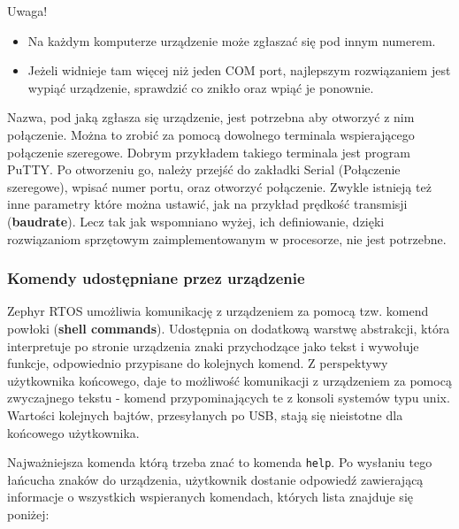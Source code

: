 \begin{minipage}{\textwidth}
\noindent Uwaga!
\vspace{-\topsep}
\begin{itemize}
    \item Na każdym komputerze urządzenie może zgłaszać się pod innym numerem.
    \item Jeżeli widnieje tam więcej niż jeden COM port, najlepszym rozwiązaniem jest wypiąć urządzenie, sprawdzić co znikło oraz wpiąć je ponownie.
\end{itemize}
\end{minipage}

\vspace{\topsep}

Nazwa, pod jaką zgłasza się urządzenie, jest potrzebna aby otworzyć z nim połączenie. Można to zrobić za pomocą dowolnego terminala wspierającego połączenie szeregowe. Dobrym przykładem takiego terminala jest program PuTTY. Po otworzeniu go, należy przejść do zakładki Serial (Połączenie szeregowe), wpisać numer portu, oraz otworzyć połączenie. Zwykle istnieją też inne parametry które można ustawić, jak na przykład prędkość transmisji (\textbf{baudrate}). Lecz tak jak wspomniano wyżej, ich definiowanie, dzięki rozwiązaniom sprzętowym zaimplementowanym w procesorze, nie jest potrzebne.

\subsubsection{Komendy udostępniane przez urządzenie}
\label{cha:commands}
Zephyr RTOS umożliwia komunikację z urządzeniem za pomocą tzw. komend powłoki (\textbf{shell commands}). Udostępnia on dodatkową warstwę abstrakcji, która interpretuje po stronie urządzenia znaki przychodzące jako tekst i wywołuje funkcje, odpowiednio przypisane do kolejnych komend. Z perspektywy użytkownika końcowego, daje to możliwość komunikacji z urządzeniem za pomocą zwyczajnego tekstu - komend przypominających te z konsoli systemów typu unix. Wartości kolejnych bajtów, przesyłanych po USB, stają się nieistotne dla końcowego użytkownika.

Najważniejsza komenda którą trzeba znać to komenda \texttt{help}. Po wysłaniu tego łańcucha znaków do urządzenia, użytkownik dostanie odpowiedź zawierającą informacje o wszystkich wspieranych komendach, których lista znajduje się poniżej:

